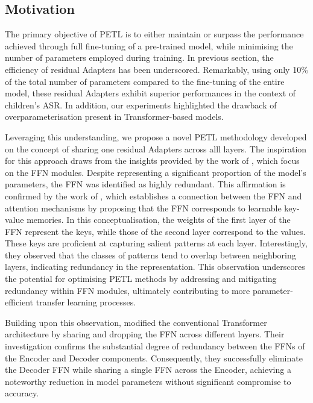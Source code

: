 \subsection{Motivation}
The primary objective of \ac{PETL} is to either maintain or surpass the performance achieved through full fine-tuning of a pre-trained model, while minimising the number of parameters employed during training. In previous section, the efficiency of residual Adapters has been underscored. Remarkably, using only 10\% of the total number of parameters compared to the fine-tuning of the entire model, these residual Adapters exhibit superior performances in the context of children's \ac{ASR}. In addition, our experiments highlighted the drawback of overparameterisation present in Transformer-based models.

Leveraging this understanding, we propose a novel \ac{PETL} methodology developed on the concept of sharing one residual Adapters across alll layers. The inspiration for this approach draws from the insights provided by the work of \cite{pires2023one}, which focus on the \ac{FFN} modules. Despite representing a significant proportion of the model's parameters, the \ac{FFN} was identified as highly redundant. This affirmation is confirmed by the work of \cite{geva2020transformer}, which  establishes a connection between the \ac{FFN} and attention mechanisms by proposing that the \ac{FFN} corresponds to learnable key-value memories. In this conceptualisation, the weights of the first layer of the \ac{FFN} represent the keys, while those of the second layer correspond to the values. These keys are proficient at capturing salient patterns at each layer. Interestingly, they observed that the classes of patterns tend to overlap between neighboring layers, indicating redundancy in the representation. This observation underscores the potential for optimising \ac{PETL} methods by addressing and mitigating redundancy within \ac{FFN} modules, ultimately contributing to more parameter-efficient transfer learning processes.

Building upon this observation, \cite{pires2023one} modified the conventional Transformer architecture by sharing and dropping the \ac{FFN} across different layers. Their investigation confirms the substantial degree of redundancy between the \acp{FFN} of the Encoder and Decoder components. Consequently, they successfully eliminate the Decoder \ac{FFN} while sharing a single \ac{FFN} across the Encoder, achieving a noteworthy reduction in model parameters without significant compromise to accuracy.

